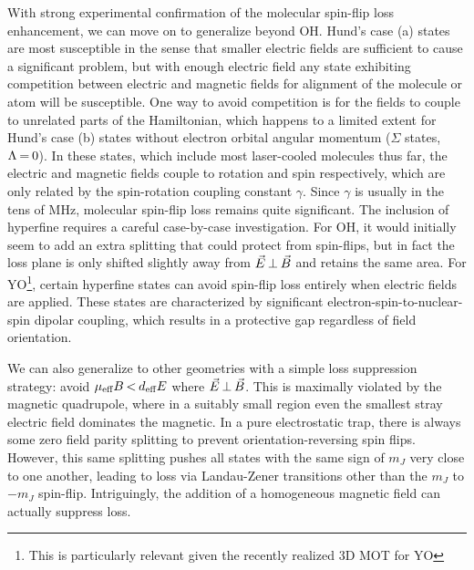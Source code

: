 \documentclass[%
 reprint,
 amsmath,amssymb,
 aps,
prl,
]{revtex4-1}
\newcommand{\epb}{{$\vec{E}\s {\perp}\s\vec{B}$}}
\newcommand{\s}{{\nobreak\hspace{.2em}}}
\begin{document}
With strong experimental confirmation of the molecular spin-flip loss enhancement, we can move on to generalize beyond OH.
Hund's case (a) states are most susceptible in the sense that smaller electric fields are sufficient to cause a significant problem, but with enough electric field any state exhibiting competition between electric and magnetic fields for alignment of the molecule or atom will be susceptible. 
One way to avoid competition is for the fields to couple to unrelated parts of the Hamiltonian, which happens to a limited extent for Hund's case (b) states without electron orbital angular momentum ($\Sigma$ states, $\Lambda\s {=}\s 0$)\s\cite{Bohn2013}. 
In these states, which include most laser-cooled molecules thus far, the electric and magnetic fields couple to rotation and spin respectively, which are only related by the spin-rotation coupling constant $\gamma$.
Since $\gamma$ is usually in the tens of MHz\s\cite{Quemener2016}, molecular spin-flip loss remains quite significant.
The inclusion of hyperfine requires a careful case-by-case investigation. For OH, it would initially seem to add an extra splitting that could protect from spin-flips, but in fact the loss plane is only shifted slightly away from \epb{} and retains the same area.
For YO\s\footnote{This is particularly relevant given the recently realized 3D MOT for YO}, certain hyperfine states can avoid spin-flip loss entirely when electric fields are applied. 
These states are characterized by significant electron-spin-to-nuclear-spin dipolar coupling, which results in a protective gap regardless of field orientation. %

We can also generalize to other geometries with a simple loss suppression strategy: avoid $\mu_\text{eff}B \s {<}\s  d_\text{eff}E$ where \epb.
This is maximally violated by the magnetic quadrupole, where in a suitably small region even the smallest stray electric field dominates the magnetic.
In a pure electrostatic trap, there is always some zero field parity splitting to prevent orientation-reversing spin flips.
However, this same splitting pushes all states with the same sign of $m_J$ very close to one another, leading to loss via Landau-Zener transitions other than the $m_J$ to $-m_J$ spin-flip\s\cite{Wall2010}.
Intriguingly, the addition of a homogeneous magnetic field can actually suppress loss\s\cite{Meek2011}.
\end{document}
